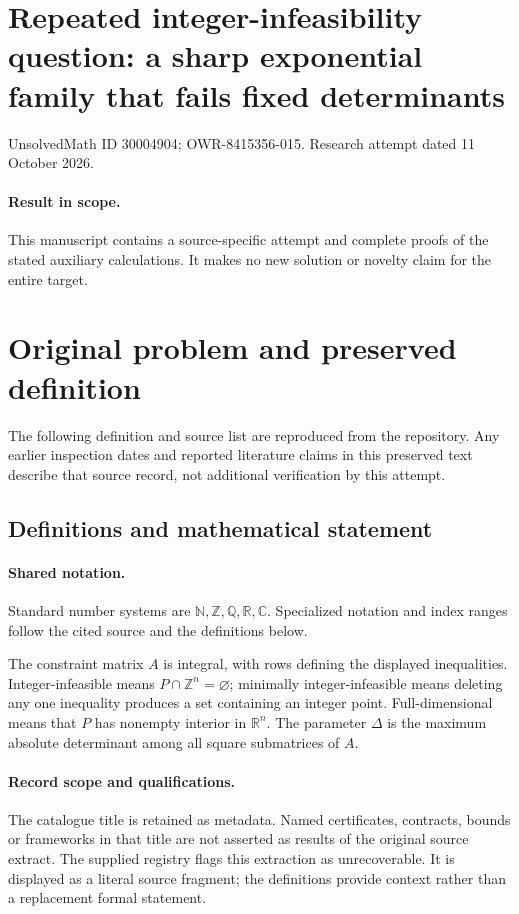 \documentclass[11pt]{article}
\begin{document}
\section*{Repeated integer-infeasibility question: a sharp exponential family that fails fixed determinants}
\noindent UnsolvedMath ID 30004904; OWR-8415356-015. Research attempt dated 11 October 2026.
\paragraph{Result in scope.}This manuscript contains a source-specific attempt and complete proofs of the stated auxiliary calculations. It makes no new solution or novelty claim for the entire target.
\section{Original problem and preserved definition}
The following definition and source list are reproduced from the repository. Any earlier inspection dates and reported literature claims in this preserved text describe that source record, not additional verification by this attempt.
\subsection{Definitions and mathematical statement}

\paragraph{Shared notation.}Standard number systems are $\mathbb N,\mathbb Z,\mathbb Q,\mathbb R,\mathbb C$. Specialized notation and index ranges follow the cited source and the definitions below.


The constraint matrix $A$ is integral, with rows defining the displayed inequalities. Integer-infeasible means $P\cap\mathbb Z^n=\varnothing$; minimally integer-infeasible means deleting any one inequality produces a set containing an integer point. Full-dimensional means that $P$ has nonempty interior in $\mathbb R^n$. The parameter $\Delta$ is the maximum absolute determinant among all square submatrices of $A$.
\paragraph{Record scope and qualifications.}
The catalogue title is retained as metadata. Named certificates, contracts, bounds or frameworks in that title are not asserted as results of the original source extract.
The supplied registry flags this extraction as unrecoverable. It is displayed as a literal source fragment; the definitions provide context rather than a replacement formal statement.
\end{document}
